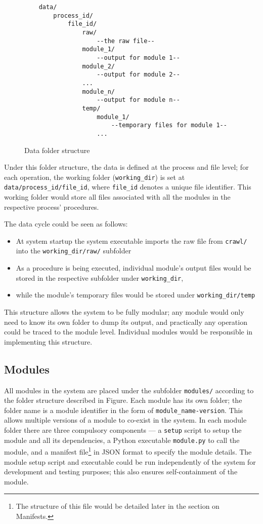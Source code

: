 \begin{figure}[ht]
\begin{lstlisting}
    data/
        process_id/
            file_id/
                raw/
                    --the raw file--
                module_1/
                    --output for module 1--
                module_2/
                    --output for module 2--
                ...
                module_n/
                    --output for module n--
                temp/
                    module_1/
                        --temporary files for module 1--
                    ...
\end{lstlisting}   
\caption{Data folder structure}\label{data} 
\end{figure}

Under this folder structure, the data is defined at the process and file level;
for each operation, the working folder (\texttt{working\_dir}) is set at
\texttt{data/process\_id/file\_id}, where \texttt{file\_id} denotes a unique
file identifier. This working folder would store all files associated with all
the modules in the respective process' procedures.

The data cycle could be seen as follows:

\begin{itemize}
    \item At system startup the system executable imports the raw file from
    \texttt{crawl/} into the \texttt{working\_dir/raw/} subfolder
    \item As a procedure is being executed, individual module's output files
    would be stored in the respective subfolder under \texttt{working\_dir},
    \item while the module's temporary files would be stored under
    \texttt{working\_dir/temp}
\end{itemize}

This structure allows the system to be fully modular; any module would only need
to know its own folder to dump íts output, and practically any operation could
be traced to the module level. Individual modules would be responsible in
implementing this structure.

\subsection{Modules}

All modules in the system are placed under the subfolder \texttt{modules/}
according to the folder structure described in Figure.
Each module has its own folder; the folder name is a module identifier in
the form of \texttt{module\_name-version}. This allows multiple versions of
a module to co-exist in the system. In each module folder there are three
compulsory components --- a \texttt{setup} script to setup the module and all
its dependencies, a Python executable \texttt{module.py} to call the module,
and a manifest file\footnote{The structure of this file would be detailed later
in the section on Manifests.} in JSON format to specify the module details.
The module setup script and executable could be run independently of the system
for development and testing purposes; this also ensures self-containment of the
module.

